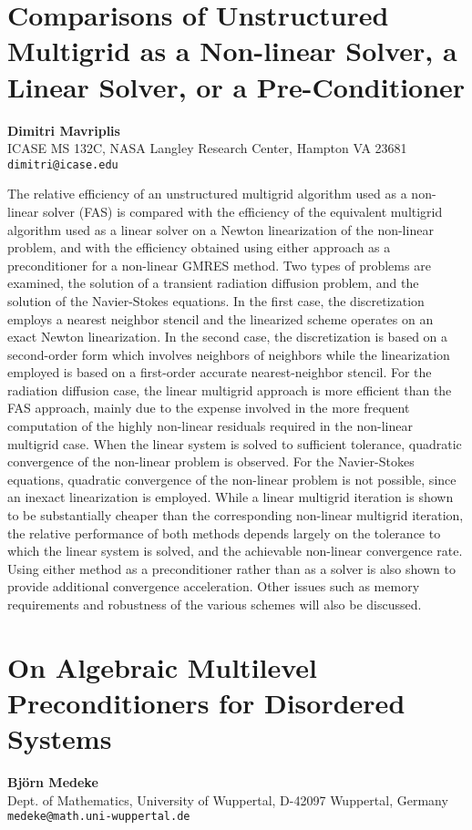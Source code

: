 \documentclass[11pt]{article}
\newcommand{\nextab}[4]{
	\section{#2}
	{\bf #1} \\ \nopagebreak
	{#3} \\ \nopagebreak
	{\tt #4} \nopagebreak
	}
\begin{document}
\nextab
{Dimitri Mavriplis}
{Comparisons of Unstructured Multigrid as a Non-linear Solver, a Linear Solver, or a Pre-Conditioner}
{ICASE MS 132C, NASA Langley Research Center, Hampton VA 23681}
{dimitri@icase.edu}


The relative efficiency of an unstructured multigrid
algorithm used as a non-linear solver (FAS)
is compared with the efficiency of the equivalent
multigrid algorithm used as a linear solver
on a Newton linearization of the non-linear problem,
and with the efficiency obtained
using either approach as a preconditioner
for a non-linear GMRES method.
Two types of problems are examined,
the solution of a transient radiation diffusion
problem, and the solution of the Navier-Stokes equations.
In the first case, the discretization employs
a nearest neighbor stencil and the linearized scheme
operates on an exact Newton linearization.
In the second case, the discretization is based
on a second-order form which involves neighbors of neighbors
while the linearization employed is based on a first-order
accurate nearest-neighbor stencil.
For the radiation diffusion case, the linear multigrid
approach is more efficient than the FAS approach,
mainly due to the expense involved in the more frequent
computation of the highly non-linear residuals required
in the non-linear multigrid case.
When the linear system is solved to sufficient
tolerance, quadratic convergence of the non-linear problem
is observed.
For the Navier-Stokes equations, quadratic convergence
of the non-linear problem is not possible, since an
inexact linearization is employed.
While a linear multigrid iteration is shown
to be substantially cheaper than the corresponding
non-linear multigrid iteration, the relative performance
of both methods depends largely on the tolerance
to which the linear system is solved, and the achievable
non-linear convergence rate.
Using either method as a preconditioner
rather than as a solver is also shown to provide
additional convergence acceleration.
Other issues such as memory requirements
and robustness of the various schemes will also be discussed.






\nextab
{Bj\"orn Medeke}
{On Algebraic Multilevel Preconditioners for Disordered Systems}
{Dept. of Mathematics, University of Wuppertal, D-42097 Wuppertal, Germany}
{medeke@math.uni-wuppertal.de}
\end{document}
